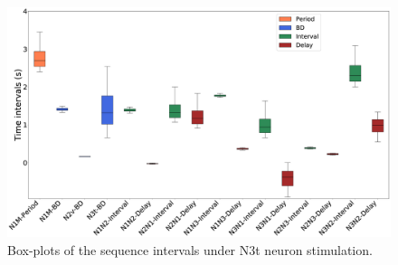 \begin{figure}[h!]
    \centering
\includegraphics[width=\textwidth]{img/results-paper-modelo/figure7.eps}
\caption{Box-plots of the sequence intervals under N3t neuron stimulation. }
\label{fig:invariant n3t boxplot}
\end{figure}


